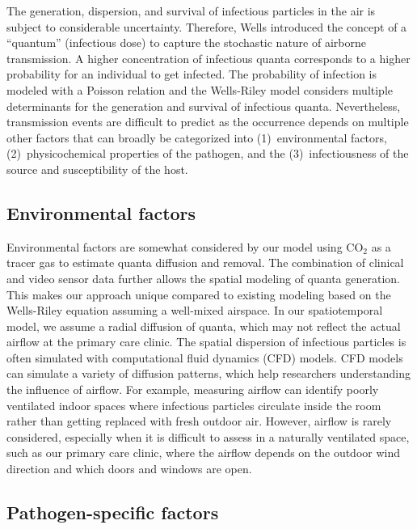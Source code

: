 \documentclass[fleqn,11pt]{wlscirep_supp}
\begin{document}
The generation, dispersion, and survival of infectious particles in the air is subject to considerable uncertainty. Therefore, Wells\cite{Wells1955} introduced the concept of a ``quantum'' (infectious dose) to capture the stochastic nature of airborne transmission. A higher concentration of infectious quanta corresponds to a higher probability for an individual to get infected. The probability of infection is modeled with a Poisson relation and the Wells-Riley model considers multiple determinants for the generation and survival of infectious quanta. Nevertheless, transmission events are difficult to predict as the occurrence depends on multiple other factors that can broadly be categorized into (1)~environmental factors, (2)~physicochemical properties of the pathogen, and the (3)~infectiousness of the source and susceptibility of the host. 

\subsection{Environmental factors}

Environmental factors are somewhat considered by our model using CO$_2$ as a tracer gas to estimate quanta diffusion and removal. The combination of clinical and video sensor data further allows the spatial modeling of quanta generation. This makes our approach unique compared to existing modeling based on the Wells-Riley equation assuming a well-mixed airspace\cite{Riley1978AJE,Rudnick2003IndoorAir}. In our spatiotemporal model, we assume a radial diffusion of quanta, which may not reflect the actual airflow at the primary care clinic. The spatial dispersion of infectious particles is often simulated with computational fluid dynamics (CFD) models\cite{Vuorinen2020SafSci,Jung2021InfectChemo,Li2021BuildEnv}. CFD models can simulate a variety of diffusion patterns, which help researchers understanding the influence of airflow. For example, measuring airflow can identify poorly ventilated indoor spaces where infectious particles circulate inside the room rather than getting replaced with fresh outdoor air\cite{Li2021BuildEnv}. However, airflow is rarely considered, especially when it is difficult to assess in a naturally ventilated space, such as our primary care clinic, where the airflow depends on the outdoor wind direction and which doors and windows are open. 

\subsection{Pathogen-specific factors}
\end{document}
